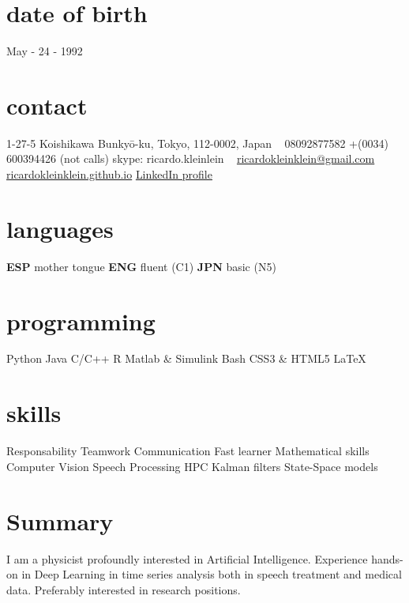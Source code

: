 \documentclass[]{friggeri-cv-a4}
\begin{document}


\begin{aside} %
\section{date of birth}
May - 24 - 1992
\section{contact}
1-27-5 Koishikawa
Bunkyō-ku, Tokyo, 112-0002,
Japan
~
08092877582
+(0034) 600394426 (not calls)
skype: ricardo.kleinlein
~
{\scriptsize \href{mailto:ricardokleinklein@gmail.com}{ricardokleinklein@gmail.com} }
{\scriptsize \href{https://ricardokleinklein.github.io}{ricardokleinklein.github.io} }
{\small \href{https://www.linkedin.com/in/rfaundezcarrasco}{LinkedIn profile} }
\section{languages}
\textbf{ESP} mother tongue
\textbf{ENG} fluent (C1)
\textbf{JPN} basic (N5)
\section{programming}
Python
Java
C/C++
R
Matlab \& Simulink
Bash
CSS3 \& HTML5
\LaTeX
\section{skills}
Responsability
Teamwork
Communication
Fast learner
Mathematical skills
Computer Vision
Speech Processing
HPC
Kalman filters
State-Space models
\end{aside}

\section{Summary}
I am a physicist profoundly interested in Artificial Intelligence. Experience hands-on in Deep Learning in time series analysis both in speech treatment and medical data. Preferably interested in research positions.
\end{document}
